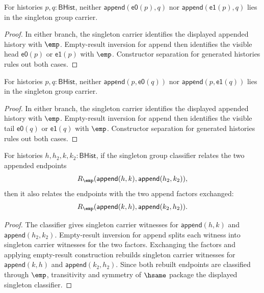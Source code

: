 \begin{theorem}
\label{thm:group-singleton-carrier-append-visible-head-absurd}
For histories $p,q:\mathsf{BHist}$, neither
$\mathsf{append}(\mathsf{e0}(p),q)$ nor
$\mathsf{append}(\mathsf{e1}(p),q)$ lies in the singleton group carrier.
\end{theorem}
\begin{proof}
In either branch, the singleton carrier identifies the displayed appended
history with $\emp$. Empty-result inversion for append then identifies the
visible head $\mathsf{e0}(p)$ or $\mathsf{e1}(p)$ with $\emp$. Constructor
separation for generated histories rules out both cases.
\end{proof}

\begin{theorem}
\label{thm:group-singleton-carrier-append-visible-tail-absurd}
For histories $p,q:\mathsf{BHist}$, neither
$\mathsf{append}(p,\mathsf{e0}(q))$ nor
$\mathsf{append}(p,\mathsf{e1}(q))$ lies in the singleton group carrier.
\end{theorem}
\begin{proof}
In either branch, the singleton carrier identifies the displayed appended
history with $\emp$. Empty-result inversion for append then identifies the
visible tail $\mathsf{e0}(q)$ or $\mathsf{e1}(q)$ with $\emp$. Constructor
separation for generated histories rules out both cases.
\end{proof}

\begin{theorem}
\label{thm:group-singleton-classifier-append-comm-congr}
For histories $h,h_2,k,k_2:\mathsf{BHist}$, if the singleton group classifier
relates the two appended endpoints
$$
R_{\emp}(\mathsf{append}(h,k),\mathsf{append}(h_2,k_2)),
$$
then it also relates the endpoints with the two append factors exchanged:
$$
R_{\emp}(\mathsf{append}(k,h),\mathsf{append}(k_2,h_2)).
$$
\end{theorem}
\begin{proof}
The classifier gives singleton carrier witnesses for
$\mathsf{append}(h,k)$ and $\mathsf{append}(h_2,k_2)$. Empty-result inversion
for append splits each witness into singleton carrier witnesses for the two
factors. Exchanging the factors and applying empty-result construction rebuilds
singleton carrier witnesses for $\mathsf{append}(k,h)$ and
$\mathsf{append}(k_2,h_2)$. Since both rebuilt endpoints are classified through
$\emp$, transitivity and symmetry of $\hsame$ package the displayed singleton
classifier.
\end{proof}

